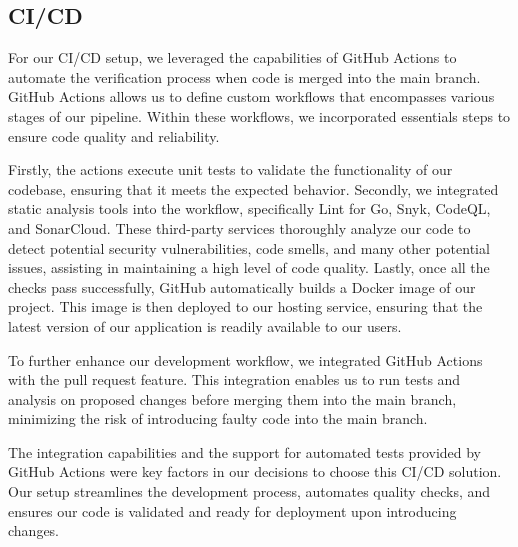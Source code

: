 \subsection{CI/CD} \label{sec:cicd}

For our CI/CD setup, we leveraged the capabilities of GitHub Actions to automate the verification process when code is merged into the main branch. GitHub Actions allows us to define custom workflows that encompasses various stages of our pipeline. Within these workflows, we incorporated essentials steps to ensure code quality and reliability.

Firstly, the actions execute unit tests to validate the functionality of our codebase, ensuring that it meets the expected behavior. Secondly, we integrated static analysis tools into the workflow, specifically Lint for Go, Snyk, CodeQL, and SonarCloud. These third-party services thoroughly analyze our code to detect potential security vulnerabilities, code smells, and many other potential issues, assisting in maintaining a high level of code quality. 
Lastly, once all the checks pass successfully, GitHub automatically builds a Docker image of our project. This image is then deployed to our hosting service, ensuring that the latest version of our application is readily available to our users.

To further enhance our development workflow, we integrated GitHub Actions with the pull request feature. This integration enables us to run tests and analysis on proposed changes before merging them into the main branch, minimizing the risk of introducing faulty code into the main branch.

The integration capabilities and the support for automated tests provided by GitHub Actions were key factors in our decisions to choose this CI/CD solution. Our setup streamlines the development process, automates quality checks, and ensures our code is validated and ready for deployment upon introducing changes.

